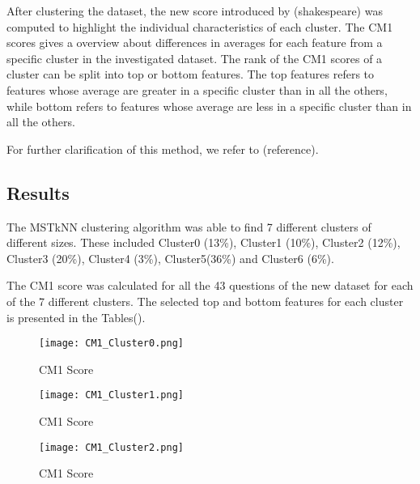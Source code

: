 \documentclass{article}
\begin{document}


After clustering the dataset, the new score introduced by (shakespeare) was
computed to highlight the individual characteristics of each cluster. The CM1
scores gives a overview about differences in averages for each feature from a
specific cluster in the investigated dataset. The rank of the CM1 scores of a
cluster can be split into top or bottom features. The top features refers to
features whose average are greater in a specific cluster than in all the others,
while bottom refers to features whose average are less in a specific cluster
than in all the others.






For further clarification of this method, we refer to (reference). 


\subsection{Results}

The MSTkNN clustering algorithm was able to find 7 different clusters of
different sizes. These included Cluster0 (13\%), Cluster1 (10\%), Cluster2
(12\%), Cluster3 (20\%), Cluster4 (3\%), Cluster5(36\%) and Cluster6 (6\%).

The CM1 score was calculated for all the 43 questions of the new dataset
for each of the 7 different clusters. The selected top and bottom features  
for each cluster is presented in the Tables().

\begin{figure}[h]
	\texttt{[image: CM1\_Cluster0.png]}
	\caption{CM1 Score}
	\label{fig:Cluster0}
\end{figure}

\begin{figure}[h]
	\texttt{[image: CM1\_Cluster1.png]}
	\caption{CM1 Score}
	\label{fig:Cluster1}
\end{figure}

\begin{figure}[h]
	\texttt{[image: CM1\_Cluster2.png]}
	\caption{CM1 Score}
	\label{fig:Cluster2}
\end{figure}
\end{document}
